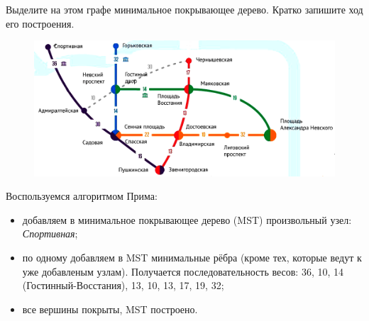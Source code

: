 \documentclass[12pt]{exam}
\begin{document}
\begin{questions}
Выделите на этом графе минимальное покрывающее дерево. Кратко запишите ход его построения.

\vspace{2cm}

\begin{figure}[ht!]
\begin{center}
  \includegraphics[width=23cm]{spb.png}
  \end{center}
\end{figure}

\begin{solution}
Воспользуемся алгоритмом Прима:
\begin{itemize}
    \item добавляем в минимальное покрывающее дерево (MST) произвольный узел: {\it Спортивная};
    \item по одному добавляем в MST минимальные рёбра (кроме тех, которые ведут к уже добавленым узлам). Получается последовательность весов: 36, 10, 14 (Гостинный-Восстания), 13, 10, 13, 17, 19, 32;
    \item все вершины покрыты, MST построено.
\end{itemize}
\end{solution}



\end{questions}
\end{document}
